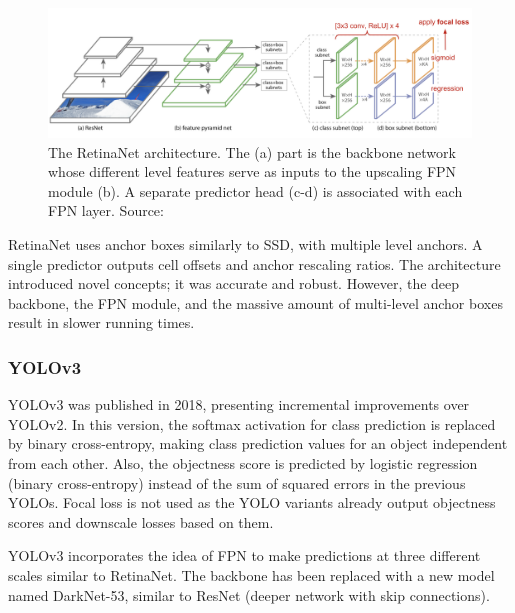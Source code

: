 \begin{figure}[htb]
 \centerline{\includegraphics[width=1.0\columnwidth]{.//Figure/Detector/RetinaNet.png}}
 \caption{The RetinaNet architecture. The (a) part is the backbone network whose different level features serve as inputs to the upscaling FPN module (b). A separate predictor head (c-d) is associated with each FPN layer. Source: \cite{ObjDetArchitectures4}}
 \label{fig:RetinaNet}
\end{figure}

RetinaNet uses anchor boxes similarly to SSD, with multiple level anchors. A single predictor outputs cell offsets and anchor rescaling ratios. The architecture introduced novel concepts; it was accurate and robust. However, the deep backbone, the FPN module, and the massive amount of multi-level anchor boxes result in slower running times.

\subsubsection{YOLOv3}

YOLOv3\cite{YOLOv3} was published in 2018, presenting incremental improvements over YOLOv2. In this version, the softmax activation for class prediction is replaced by binary cross-entropy, making class prediction values for an object independent from each other. Also, the objectness score is predicted by logistic regression (binary cross-entropy) instead of the sum of squared errors in the previous YOLOs. Focal loss is not used as the YOLO variants already output objectness scores and downscale losses based on them.

YOLOv3 incorporates the idea of FPN to make predictions at three different scales similar to RetinaNet. The backbone has been replaced with a new model named DarkNet-53, similar to ResNet (deeper network with skip connections).

